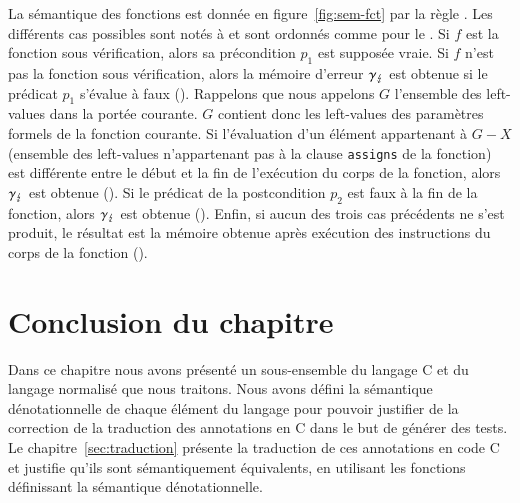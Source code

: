 La sémantique des fonctions est donnée en figure~\ref{fig:sem-fct} par la règle
.
Les différents cas possibles sont notés  à  et sont
ordonnés comme pour le .
Si $f$ est la fonction sous vérification, alors sa précondition $p_1$ est
supposée vraie.
Si $f$ n'est pas la fonction sous vérification, alors la mémoire d'erreur
$\gamma_\lightning$ est obtenue si le prédicat $p_1$ s'évalue à faux ().
Rappelons que nous appelons $G$ l'ensemble des left-values dans la portée
courante.
$G$ contient donc les left-values des paramètres formels de la fonction
courante.
Si l'évaluation d'un élément appartenant à $G-X$ (ensemble des left-values
n'appartenant pas à la clause \lstinline'assigns' de la fonction) est différente
entre le début et la fin de l'exécution du corps de la fonction, alors
$\gamma_\lightning$ est obtenue ().
Si le prédicat de la postcondition $p_2$ est faux à la fin de la fonction, alors
$\gamma_\lightning$ est obtenue ().
Enfin, si aucun des trois cas précédents ne s'est produit, le résultat est la
mémoire obtenue après exécution des instructions du corps de la fonction
().


\section*{Conclusion du chapitre}

Dans ce chapitre nous avons présenté un sous-ensemble du langage C et du
langage \eacsl normalisé que nous traitons.
Nous avons défini la sémantique dénotationnelle de chaque élément du langage
pour pouvoir justifier de la correction de la traduction des annotations en C
dans le but de générer des tests.
Le chapitre~\ref{sec:traduction} présente la traduction de ces annotations
\eacsl en code C et justifie qu'ils sont sémantiquement équivalents, en
utilisant les fonctions définissant la sémantique dénotationnelle.
